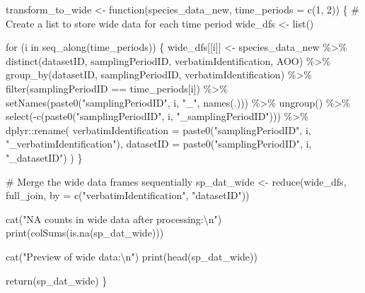 \documentclass[
  letterpaper,
  DIV=11,
  numbers=noendperiod]{scrreprt}
\newenvironment{Shaded}{\begin{snugshade}}{\end{snugshade}}
\newcommand{\AttributeTok}[1]{\textcolor[rgb]{0.40,0.45,0.13}{#1}}
\newcommand{\CommentTok}[1]{\textcolor[rgb]{0.37,0.37,0.37}{#1}}
\newcommand{\ControlFlowTok}[1]{\textcolor[rgb]{0.00,0.23,0.31}{#1}}
\newcommand{\DecValTok}[1]{\textcolor[rgb]{0.68,0.00,0.00}{#1}}
\newcommand{\FunctionTok}[1]{\textcolor[rgb]{0.28,0.35,0.67}{#1}}
\newcommand{\NormalTok}[1]{\textcolor[rgb]{0.00,0.23,0.31}{#1}}
\newcommand{\OtherTok}[1]{\textcolor[rgb]{0.00,0.23,0.31}{#1}}
\newcommand{\SpecialCharTok}[1]{\textcolor[rgb]{0.37,0.37,0.37}{#1}}
\newcommand{\StringTok}[1]{\textcolor[rgb]{0.13,0.47,0.30}{#1}}
\begin{document}
\begin{Shaded}
\begin{Highlighting}[]
\NormalTok{transform\_to\_wide }\OtherTok{\textless{}{-}} \ControlFlowTok{function}\NormalTok{(species\_data\_new, }\AttributeTok{time\_periods =} \FunctionTok{c}\NormalTok{(}\DecValTok{1}\NormalTok{, }\DecValTok{2}\NormalTok{)) \{}
  \CommentTok{\# Create a list to store wide data for each time period}
\NormalTok{  wide\_dfs }\OtherTok{\textless{}{-}} \FunctionTok{list}\NormalTok{()}

  \ControlFlowTok{for}\NormalTok{ (i }\ControlFlowTok{in} \FunctionTok{seq\_along}\NormalTok{(time\_periods)) \{}
\NormalTok{    wide\_dfs[[i]] }\OtherTok{\textless{}{-}}\NormalTok{ species\_data\_new }\SpecialCharTok{\%\textgreater{}\%}
      \FunctionTok{distinct}\NormalTok{(datasetID, samplingPeriodID, verbatimIdentification, AOO) }\SpecialCharTok{\%\textgreater{}\%}
      \FunctionTok{group\_by}\NormalTok{(datasetID, samplingPeriodID, verbatimIdentification) }\SpecialCharTok{\%\textgreater{}\%}
      \FunctionTok{filter}\NormalTok{(samplingPeriodID }\SpecialCharTok{==}\NormalTok{ time\_periods[i]) }\SpecialCharTok{\%\textgreater{}\%}
      \FunctionTok{setNames}\NormalTok{(}\FunctionTok{paste0}\NormalTok{(}\StringTok{"samplingPeriodID"}\NormalTok{, i, }\StringTok{"\_"}\NormalTok{, }\FunctionTok{names}\NormalTok{(.))) }\SpecialCharTok{\%\textgreater{}\%}
      \FunctionTok{ungroup}\NormalTok{() }\SpecialCharTok{\%\textgreater{}\%}
      \FunctionTok{select}\NormalTok{(}\SpecialCharTok{{-}}\FunctionTok{c}\NormalTok{(}\FunctionTok{paste0}\NormalTok{(}\StringTok{"samplingPeriodID"}\NormalTok{, i, }\StringTok{"\_samplingPeriodID"}\NormalTok{))) }\SpecialCharTok{\%\textgreater{}\%}
\NormalTok{      dplyr}\SpecialCharTok{::}\FunctionTok{rename}\NormalTok{(}
        \AttributeTok{verbatimIdentification =} \FunctionTok{paste0}\NormalTok{(}\StringTok{"samplingPeriodID"}\NormalTok{, i, }\StringTok{"\_verbatimIdentification"}\NormalTok{),}
        \AttributeTok{datasetID =} \FunctionTok{paste0}\NormalTok{(}\StringTok{"samplingPeriodID"}\NormalTok{, i, }\StringTok{"\_datasetID"}\NormalTok{)}
\NormalTok{      )}
\NormalTok{  \}}

  \CommentTok{\# Merge the wide data frames sequentially}
\NormalTok{  sp\_dat\_wide }\OtherTok{\textless{}{-}} \FunctionTok{reduce}\NormalTok{(wide\_dfs, full\_join, }\AttributeTok{by =} \FunctionTok{c}\NormalTok{(}\StringTok{"verbatimIdentification"}\NormalTok{, }\StringTok{"datasetID"}\NormalTok{))}

  \FunctionTok{cat}\NormalTok{(}\StringTok{"NA counts in wide data after processing:}\SpecialCharTok{\textbackslash{}n}\StringTok{"}\NormalTok{)}
  \FunctionTok{print}\NormalTok{(}\FunctionTok{colSums}\NormalTok{(}\FunctionTok{is.na}\NormalTok{(sp\_dat\_wide)))}

  \FunctionTok{cat}\NormalTok{(}\StringTok{"Preview of wide data:}\SpecialCharTok{\textbackslash{}n}\StringTok{"}\NormalTok{)}
  \FunctionTok{print}\NormalTok{(}\FunctionTok{head}\NormalTok{(sp\_dat\_wide))}

  \FunctionTok{return}\NormalTok{(sp\_dat\_wide)}
\NormalTok{\}}
\end{Highlighting}
\end{Shaded}
\end{document}
